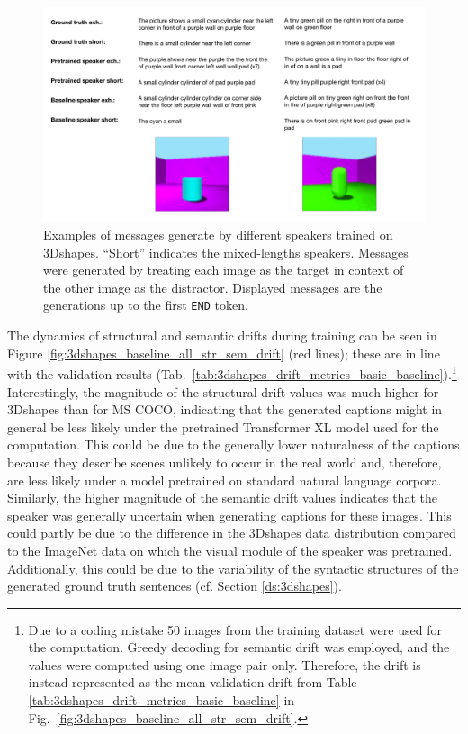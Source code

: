 \begin{figure}[h]
	\centering
	\includegraphics[width=\linewidth]{images/example_generations/shapes_randomPairs.pdf}
	\caption{Examples of messages generate by different speakers trained on 3Dshapes. ``Short'' indicates the mixed-lengths speakers. Messages were generated by treating each image as the target in context of the other image as the distractor. Displayed messages are the generations up to the first \texttt{END} token.}
	\label{fig:shapes_randPairs_speaker_generations}
\end{figure}
 
The dynamics of structural and semantic drifts during training can be seen in Figure \ref{fig:3dshapes_baseline_all_str_sem_drift} (red lines); these are in line with the validation results (Tab.~\ref{tab:3dshapes_drift_metrics_basic_baseline}).\footnote{Due to a coding mistake 50 images from the training dataset were used for the computation. Greedy decoding for semantic drift was employed, and the values were computed using one image pair only. Therefore, the drift is instead represented as the mean validation drift from Table \ref{tab:3dshapes_drift_metrics_basic_baseline} in Fig.~\ref{fig:3dshapes_baseline_all_str_sem_drift}.}
Interestingly, the magnitude of the structural drift values was much higher for 3Dshapes than for MS COCO, indicating that the generated captions might in general be less likely under the pretrained Transformer XL model used for the computation. This could be due to the generally lower naturalness of the captions because they describe scenes unlikely to occur in the real world and, therefore, are less likely under a model pretrained on standard natural language corpora. Similarly, the higher magnitude of the semantic drift values indicates that the speaker was generally uncertain when generating captions for these images. This could partly be due to the difference in the 3Dshapes data distribution compared to the ImageNet data on which the visual module of the speaker was pretrained. Additionally, this could be due to the variability of the syntactic structures of the generated ground truth sentences (cf. Section \ref{ds:3dshapes}). 

